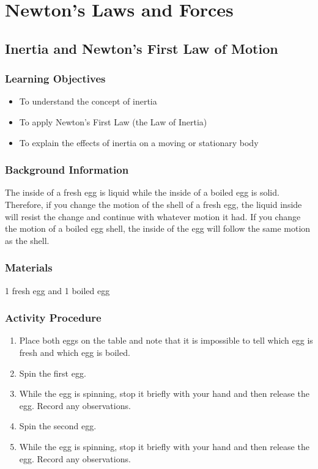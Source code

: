 \section{Newton's Laws and Forces}

\subsection{Inertia and Newton's First Law of Motion}

\subsubsection*{Learning Objectives}
\begin{itemize}
\item{To understand the concept of inertia} 
\item{To apply Newton's First Law (the Law of Inertia)} 
\item{To explain the effects of inertia on a moving or stationary body} 
\end{itemize}

\subsubsection*{Background Information}
The inside of a fresh egg is liquid while the inside of a boiled egg is solid. Therefore, if you change the motion of the shell of a fresh egg, the liquid inside will resist the change and continue with whatever motion it had. If you change the motion of a boiled egg shell, the inside of the egg will follow the same motion as the shell.  

\subsubsection*{Materials}
1 fresh egg and 1 boiled egg

\subsubsection*{Activity Procedure}
\begin{enumerate}
\item{Place both eggs on the table and note that it is impossible to tell which egg is fresh and which egg is boiled.} 
\item{Spin the first egg.} 
\item{While the egg is spinning, stop it briefly with your hand and then release the egg.  Record any observations.} 
\item{Spin the second egg.} 
\item{While the egg is spinning, stop it briefly with your hand and then release the egg.  Record any observations.} 
\end{enumerate}


